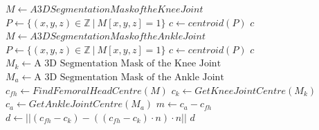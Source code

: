 \documentclass[a4paper,12pt]{article}
\newcommand{\Z}{\mathbb{Z}}
\begin{document}
	\begin{algorithm}
		\caption{Mikulicz Line Deviation Calculation}
		\label{alg:mikulicz}
		\begin{algorithmic}[1]
				\State $M \gets A 3D Segmentation Mask of the Knee Joint$
				\State $P \gets \{(x, y, z) \in \Z \: | \: M[x, y, z] = 1\}$
				\State $c \gets centroid(P)$
				\State \Return $c$
			\EndProcedure
				\State $M \gets A 3D Segmentation Mask of the Ankle Joint$
				\State $P \gets \{(x, y, z) \in \Z \: | \: M[x, y, z] = 1\}$
				\State $c \gets centroid(P)$
				\State \Return $c$
			\EndProcedure
				\State $M_k \gets \text{A 3D Segmentation Mask of the Knee Joint}$
				\State $M_a \gets \text{A 3D Segmentation Mask of the Ankle Joint}$
				\State $c_{fh} \gets FindFemoralHeadCentre(M)$
				\State $c_{k} \gets GetKneeJointCentre(M_k)$
				\State $c_{a} \gets GetAnkleJointCentre(M_a)$
				\State $m \gets c_{a} - c_{fh}$
				\State $d \gets \lvert \lvert (c_{fh} - c_k) - ((c_{fh} - c_k) \cdot n) \cdot n \rvert \rvert$
				\State \Return $d$
			\EndProcedure
		\end{algorithmic}
	\end{algorithm}
\end{document}

